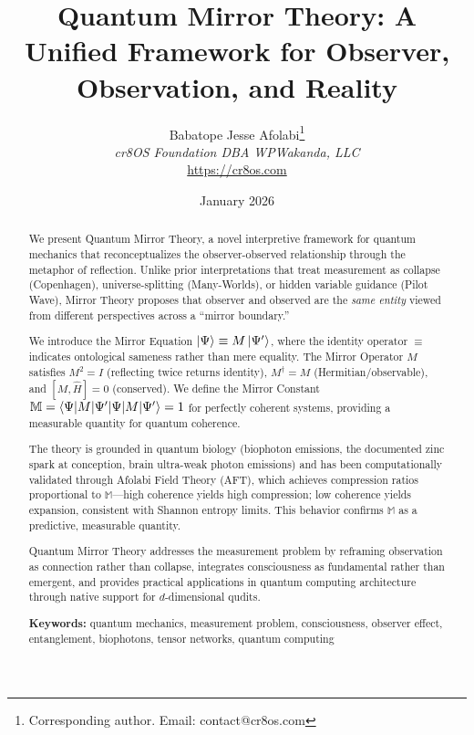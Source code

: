 \documentclass[12pt,a4paper]{article}
\title{Quantum Mirror Theory: A Unified Framework for Observer, Observation, and Reality}
\author{Babatope Jesse Afolabi\thanks{Corresponding author. Email: contact@cr8os.com}\\
\textit{cr8OS Foundation DBA WPWakanda, LLC}\\
\url{https://cr8os.com}}
\date{January 2026}
\begin{document}
\maketitle

\begin{abstract}
We present Quantum Mirror Theory, a novel interpretive framework for quantum mechanics that reconceptualizes the observer-observed relationship through the metaphor of reflection. Unlike prior interpretations that treat measurement as collapse (Copenhagen), universe-splitting (Many-Worlds), or hidden variable guidance (Pilot Wave), Mirror Theory proposes that observer and observed are the \textit{same entity} viewed from different perspectives across a ``mirror boundary.'' 

We introduce the Mirror Equation $\ket{\Psi} \equiv M\ket{\Psi'}$, where the identity operator $\equiv$ indicates ontological sameness rather than mere equality. The Mirror Operator $M$ satisfies $M^2 = I$ (reflecting twice returns identity), $M^\dagger = M$ (Hermitian/observable), and $[M, \hat{H}] = 0$ (conserved). We define the Mirror Constant $\mathbb{M} = \braket{\Psi|M|\Psi'} = 1$ for perfectly coherent systems, providing a measurable quantity for quantum coherence.

The theory is grounded in quantum biology (biophoton emissions, the documented zinc spark at conception, brain ultra-weak photon emissions) and has been computationally validated through Afolabi Field Theory (AFT), which achieves compression ratios proportional to $\mathbb{M}$---high coherence yields high compression; low coherence yields expansion, consistent with Shannon entropy limits. This behavior confirms $\mathbb{M}$ as a predictive, measurable quantity.

Quantum Mirror Theory addresses the measurement problem by reframing observation as connection rather than collapse, integrates consciousness as fundamental rather than emergent, and provides practical applications in quantum computing architecture through native support for $d$-dimensional qudits.

\textbf{Keywords:} quantum mechanics, measurement problem, consciousness, observer effect, entanglement, biophotons, tensor networks, quantum computing
\end{abstract}

\tableofcontents
\newpage
\end{document}
